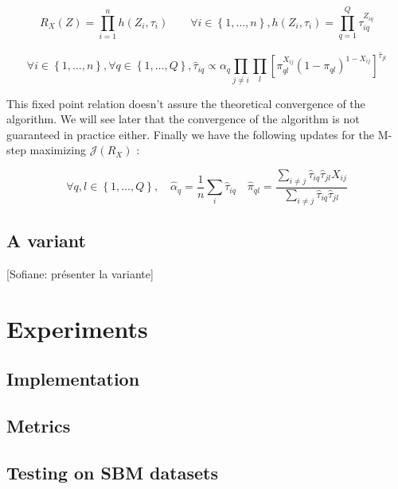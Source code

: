 \documentclass[10pt]{article}
\begin{document}
\begin{equation}
    \label{eq:approximated_distribution}
    R_X(Z)=\prod_{i=1}^n h(Z_i, \tau_i) \quad\quad \forall i \in \left\{1,\dots,n\right\}, h(Z_i, \tau_i)=\prod_{q=1}^Q \tau_{iq}^{Z_{iq}}
\end{equation}

\begin{equation}
    \label{eq:fixed_point}
    \forall i \in \left\{1,\dots,n\right\}, \forall q \in \left\{1,\dots,Q\right\}, \hat{\tau}_{iq}\propto \alpha_q \prod_{j\neq i}\prod_l \left[\pi_{ql}^{X_{ij}}(1-\pi_{ql})^{1-X_{ij}}\right]^{\hat{\tau}_{jl}}
\end{equation}

This fixed point relation doesn't assure the theoretical convergence of the algorithm. We will see later that the convergence of the algorithm is not guaranteed in practice either. Finally we have the following updates for the M-step maximizing $\mathcal{J}(R_X)$ :

\begin{equation}
    \label{eq:m_step}
    \forall q, l \in \left\{1,\dots,Q\right\}, \quad
    \hat{\alpha}_q=\frac{1}{n}\sum_{i} \hat{\tau}_{iq}
    \quad
    \hat{\pi}_{ql}=\frac{\sum_{i\neq j} \hat{\tau}_{iq}\hat{\tau}_{jl}X_{ij}}{\sum_{i\neq j} \hat{\tau}_{iq}\hat{\tau}_{jl}}
\end{equation}


\subsection{A variant}

[Sofiane: présenter la variante]


\section{Experiments}
\label{sec:experiments}

\subsection{Implementation}


\subsection{Metrics}
    \label{subsec:metrics}

\subsection{Testing on SBM datasets}
\end{document}
